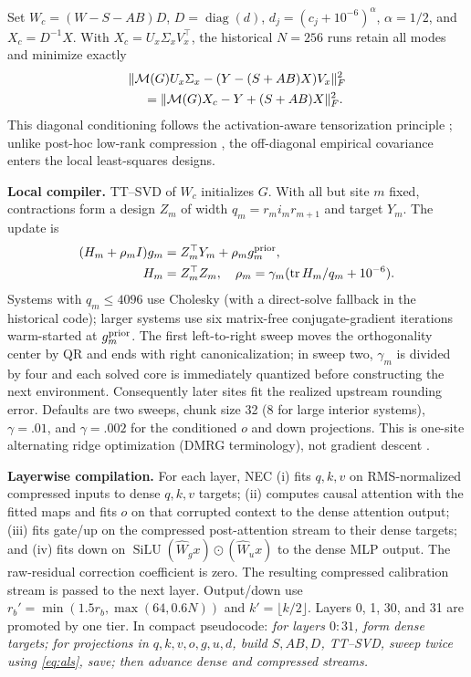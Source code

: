 \documentclass[10pt,twocolumn]{article}
\newcommand{\M}{\mathcal{M}}
\begin{document}
Set $W_c=(W-S-AB)D$, $D=\operatorname{diag}(d)$, $d_j=(c_j+10^{-6})^{\alpha}$, $\alpha=1/2$, and $X_c=D^{-1}X$.  With $X_c=U_x\Sigma_xV_x^\top$, the historical $N=256$ runs retain all modes and minimize exactly
\begin{equation}
\begin{aligned}
 &\|\M(G)U_x\Sigma_x-(Y-(S+AB)X)V_x\|_F^2\\
 &\hspace{1.2em}=\|\M(G)X_c-Y+(S+AB)X\|_F^2.
\end{aligned}                                                   \label{eq:weighted}
\end{equation}
This diagonal conditioning follows the activation-aware tensorization principle \cite{awt2026}; unlike post-hoc low-rank compression \cite{svdllm}, the off-diagonal empirical covariance enters the local least-squares designs.

\textbf{Local compiler.}
TT--SVD of $W_c$ initializes $G$.  With all but site $m$ fixed, contractions form a design $Z_m$ of width $q_m=r_mi_mr_{m+1}$ and target $Y_m$.  The update is
\begin{equation}
\begin{aligned}
 (H_m+\rho_mI)g_m&=Z_m^\top Y_m+\rho_mg_m^{\rm prior},\\
 H_m&=Z_m^\top Z_m,\quad
 \rho_m=\gamma_m(\operatorname{tr}H_m/q_m+10^{-6}).
\end{aligned}                                                   \label{eq:als}
\end{equation}
Systems with $q_m\le4096$ use Cholesky (with a direct-solve fallback in the historical code); larger systems use six matrix-free conjugate-gradient iterations warm-started at $g_m^{\rm prior}$.  The first left-to-right sweep moves the orthogonality center by QR and ends with right canonicalization; in sweep two, $\gamma_m$ is divided by four and each solved core is immediately quantized before constructing the next environment.  Consequently later sites fit the realized upstream rounding error.  Defaults are two sweeps, chunk size 32 (8 for large interior systems), $\gamma=.01$, and $\gamma=.002$ for the conditioned $o$ and down projections.  This is one-site alternating ridge optimization (DMRG terminology), not gradient descent \cite{schollwock2011}.

\textbf{Layerwise compilation.}
For each layer, NEC (i) fits $q,k,v$ on RMS-normalized compressed inputs to dense $q,k,v$ targets; (ii) computes causal attention with the fitted maps and fits $o$ on that corrupted context to the dense attention output; (iii) fits gate/up on the compressed post-attention stream to their dense targets; and (iv) fits down on $\operatorname{SiLU}(\widehat W_gx)\odot(\widehat W_ux)$ to the dense MLP output.  The raw-residual correction coefficient is zero.  The resulting compressed calibration stream is passed to the next layer.  Output/down use $r_b'=\min(1.5r_b,\max(64,0.6N))$ and $k'=\lfloor k/2\rfloor$.  Layers 0, 1, 30, and 31 are promoted by one tier.  In compact pseudocode: \emph{for layers $0{:}31$, form dense targets; for projections in $q,k,v,o,g,u,d$, build $S,AB,D$, TT--SVD, sweep twice using \eqref{eq:als}, save; then advance dense and compressed streams.}
\end{document}
